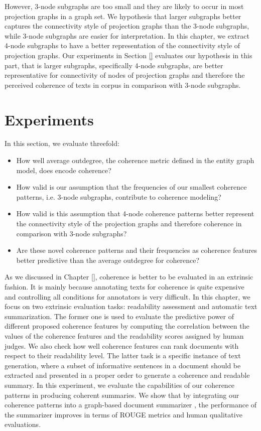 However, 3-node subgraphs are too small and they are likely to occur in most projection graphs in a graph set. 
We hypothesis that larger subgraphs better captures the connectivity style of projection graphs than the 3-node subgraphs, while 3-node subgraphs are easier for interpretation. 
In this chapter, we extract 4-node subgraphs to have a better representation of the connectivity style of projection graphs. 
Our experiments in Section \ref{} evaluates our hypothesis in this part, that is larger subgraphs, specifically 4-node subgraphs, are better representative for connectivity of nodes of projection graphs and therefore the perceived coherence of texts in corpus in comparison with 3-node subgraphs.


\section{Experiments}
\label{sec:experiments}
%
In this section, we evaluate threefold:
\begin{itemize}
	\item How well average outdegree, the coherence metric defined in the entity graph model, does encode coherence?
	\item How valid is our assumption that the frequencies of our smallest coherence patterns, i.e. 3-node subgraphs, contribute to coherence modeling?
	\item How valid is this assumption that 4-node coherence patterns better represent the connectivity style of the projection graphs and therefore coherence in comparison with 3-node subgraphs?
	\item Are these novel coherence patterns and their frequencies as coherence features better predictive than the average outdegree for coherence?
\end{itemize}

As we discussed in Chapter \ref{}, coherence is better to be evaluated in an extrinsic fashion. 
It is mainly because annotating texts for coherence is quite expensive and controlling all conditions for annotators is very difficult. 
In this chapter, we focus on two extrinsic evaluation tasks: readability assessment and automatic text summarization. 
The former one is used to evaluate the predictive power of different proposed coherence features by computing the correlation between the values of the coherence features and the readability scores assigned by human judges. 
We also check how well coherence features can rank documents with respect to their readability level. 
The latter task is a specific instance of text generation, where a subset of informative sentences in a document should be extracted and presented in a proper order to generate a coherence and readable summary. 
In this experiment, we evaluate the capabilities of our coherence patterns in producing coherent summaries. 
We show that by integrating our coherence patterns into a graph-based document summarizer \cite{parveen15}, the performance of the summarizer improves in terms of ROUGE metrics and human qualitative evaluations.

